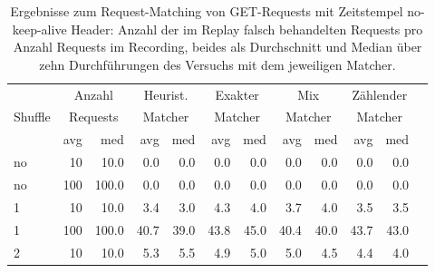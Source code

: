 \documentclass[12pt,a4paper]{report}
\begin{document}
\begin{table}[H]
	\centering
	\caption{
		Ergebnisse zum Request-Matching von GET-Requests mit Zeitstempel no-keep-alive Header:
		Anzahl der im Replay falsch behandelten Requests pro Anzahl Requests im Recording,
		beides als Durchschnitt und Median über zehn Durchführungen des Versuchs mit dem jeweiligen Matcher.
	}
	\label{tab:get_ts_nka}
	\begin{tabular}{|l|r|r|r|r|r|r|r|r|r|r|r|}
		\hline
		\multirow{3}{*}{Shuffle} & \multicolumn{2}{|c|}{Anzahl}   & \multicolumn{2}{|c|}{Heurist.} & \multicolumn{2}{|c|}{Exakter} & \multicolumn{2}{|c|}{Mix}     & \multicolumn{2}{|c|}{Zählender}                                    \\
		                         & \multicolumn{2}{|c|}{Requests} & \multicolumn{2}{|c|}{Matcher}  & \multicolumn{2}{|c|}{Matcher} & \multicolumn{2}{|c|}{Matcher} & \multicolumn{2}{|c|}{Matcher}                                      \\ \cline{2-11}
		                         & avg                            & med                            & avg                           & med                           & avg                             & med  & avg  & med  & avg  & med  \\ \hline
		no                       & 10                             & 10.0                           & 0.0                           & 0.0                           & 0.0                             & 0.0  & 0.0  & 0.0  & 0.0  & 0.0  \\ \hline
		no                       & 100                            & 100.0                          & 0.0                           & 0.0                           & 0.0                             & 0.0  & 0.0  & 0.0  & 0.0  & 0.0  \\ \hline
		1                        & 10                             & 10.0                           & 3.4                           & 3.0                           & 4.3                             & 4.0  & 3.7  & 4.0  & 3.5  & 3.5  \\ \hline
		1                        & 100                            & 100.0                          & 40.7                          & 39.0                          & 43.8                            & 45.0 & 40.4 & 40.0 & 43.7 & 43.0 \\ \hline
		2                        & 10                             & 10.0                           & 5.3                           & 5.5                           & 4.9                             & 5.0  & 5.0  & 4.5  & 4.4  & 4.0  \\ \hline

\end{tabular}
\end{table}
\end{document}
